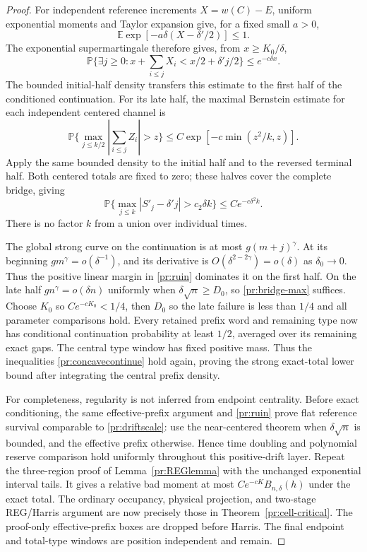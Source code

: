 \begin{proof}
For independent reference increments $X=w(C)-E$, uniform exponential
moments and Taylor expansion give, for a fixed small $a>0$,
\[
 \mathbb E\exp[-a\delta(X-\delta'/2)]\le1.
\]
The exponential supermartingale therefore gives, from $x\ge K_0/\delta$,
\begin{equation}
 \mathbb P\{\exists j\ge0:x+\textstyle\sum_{i\le j}X_i
                      <x/2+\delta'j/2\}\le e^{-c\delta x}.
 \label{pr:ruin}
\end{equation}
The bounded initial-half density transfers this estimate to the first
half of the conditioned continuation. For its late half, the maximal
Bernstein estimate for each independent centered channel is
\[
 \mathbb P\{\max_{j\le k/2}|\textstyle\sum_{i\le j}Z_i|>z\}
          \le C\exp[-c\min(z^2/k,z)].
\]
Apply the same bounded density to the initial half and to the reversed
terminal half. Both centered totals are fixed to zero; these halves
cover the complete bridge, giving
\begin{equation}
 \mathbb P\{\max_{j\le k}|S'_j-\delta'j|>c_2\delta k\}
                    \le C e^{-c\delta^2 k}.                \label{pr:bridge-max}
\end{equation}
There is no factor $k$ from a union over individual times.

The global strong curve on the continuation is at most $g(m+j)^\gamma$.
At its beginning $gm^\gamma=o(\delta^{-1})$, and its derivative is
$O(\delta^{2-2\gamma})=o(\delta)$ as $\delta_0\to0$.
Thus the positive linear margin in \eqref{pr:ruin} dominates it on the
first half. On the late half $gn^\gamma=o(\delta n)$ uniformly when
$\delta\sqrt n\ge D_0$, so \eqref{pr:bridge-max} suffices.
Choose $K_0$ so $Ce^{-cK_0}<1/4$, then $D_0$ so the late failure is
less than $1/4$ and all parameter comparisons hold. Every retained
prefix word and remaining type now has conditional continuation
probability at least $1/2$, averaged over its remaining exact gaps.
The central type window has fixed positive mass. Thus the inequalities
\eqref{pr:concavecontinue} hold again, proving the strong exact-total
lower bound after integrating the central prefix density.

For completeness, regularity is not inferred from endpoint centrality.
Before exact conditioning, the same effective-prefix argument and
\eqref{pr:ruin} prove flat reference survival comparable to
\eqref{pr:driftscale}: use the near-centered theorem when
$\delta\sqrt n$ is bounded, and the effective prefix otherwise.
Hence time doubling and polynomial reserve comparison hold uniformly
throughout this positive-drift layer. Repeat the three-region proof of
Lemma~\ref{pr:REGlemma} with the unchanged exponential interval tails.
It gives a relative bad moment at most
$Ce^{-cK}B_{n,\delta}(h)$ under the exact total. The ordinary occupancy,
physical projection, and two-stage REG/Harris argument are now precisely
those in Theorem~\ref{pr:cell-critical}. The proof-only effective-prefix
boxes are dropped before Harris. The final endpoint and total-type
windows are position independent and remain.


\end{proof}
